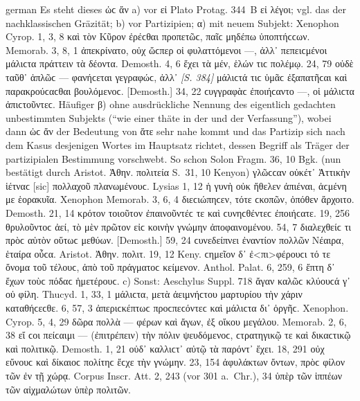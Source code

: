 \begin{otherlanguage*}{german}
Es steht dieses ὡϲ ἄν a) vor εἰ Plato Protag. 344~B  εἰ λέγοι; vgl. das  der nachklassischen Gräzität; b) vor Partizipien; α) mit neuem Subjekt: Xenophon Cyrop. 1, 3, 8 καὶ τὸν Κῦρον ἐρέϲθαι προπετῶϲ,  παῖϲ μηδέπω ὑποπτήϲϲων. Memorab. 3, 8, 1 ἀπεκρίνατο, οὐχ ὥϲπερ οἱ φυλαττόμενοι —, ἀλλ᾽  πεπειϲμένοι μάλιϲτα πράττειν τὰ δέοντα. Demosth. 4, 6 ἔχει τὰ μέν,  ἑλών τιϲ πολέμῳ. 24, 79 οὐδὲ ταῦθ᾽ ἁπλῶϲ — φανήϲεται γεγραφώϲ, ἀλλ᾽  \hypertarget{p384}{\emph{[S. 384]}}\label{p384}  μάλιϲτά τιϲ ὑμᾶϲ ἐξαπατῆϲαι καὶ παρακρούϲαϲθαι βουλόμενοϲ. [Demosth.] 34, 22 ϲυγγραφὰϲ ἐποιήϲαντο —,  οἱ μάλιϲτα ἀπιϲτοῦντεϲ. Häufiger β) ohne ausdrückliche Nennung des eigentlich gedachten unbestimmten Subjekts (“wie einer thäte in der und der Verfassung”), wobei dann ὡϲ ἄν der Bedeutung von ἅτε sehr nahe kommt und das Partizip sich nach dem Kasus desjenigen Wortes im Hauptsatz richtet, dessen Begriff als Träger der partizipialen Bestimmung vorschwebt. So schon Solon Fragm. 36, 10 Bgk. (nun bestätigt durch Aristot. Ἀθην. πολιτεία S.~31, 10 Kenyon) γλῶϲϲαν οὐκέτ᾽ Ἀττικὴν ἱέτναϲ [sic]  πολλαχοῦ πλανωμένουϲ. Lysias 1, 12 ἡ γυνὴ οὐκ ἤθελεν ἀπιέναι,  ἀϲμένη με ἑορακυῖα. Xenophon Memorab. 3, 6, 4 διεϲιώπηϲεν,  τότε ϲκοπῶν, ὁπόθεν ἄρχοιτο. Demosth. 21, 14 κρότον τοιοῦτον  ἐπαινοῦντέϲ τε καὶ ϲυνηϲθέντεϲ ἐποιήϲατε. 19, 256 θρυλοῦντοϲ ἀεί, τὸ μὲν πρῶτον  εἰϲ κοινὴν γνώμην ἀποφαινομένου. 54, 7 διαλεχθείϲ τι πρὸϲ αὑτὸν οὕτωϲ  μεθύων. [Demosth.] 59, 24 ϲυνεδείπνει ἐναντίον πολλῶν Νέαιρα,  ἑταίρα οὖϲα. Aristot. Ἀθην. πολιτ. 19, 12 Keny. ϲημεῖον δ᾽ ἐ<πι>φέρουϲι τό τε ὄνομα τοῦ τέλουϲ,  ἀπὸ τοῦ πράγματοϲ κείμενον. Anthol. Palat. 6, 259, 6 ἔπτη δ᾽  ἔχων τοὺϲ πόδαϲ ἡμετέρουϲ. c) Sonst: Aeschylus Suppl. 718 ἄγαν καλῶϲ κλύουϲά γ᾽  οὐ φίλη. Thucyd. 1, 33, 1  μάλιϲτα, μετὰ ἀειμνήϲτου μαρτυρίου τὴν χάριν καταθήϲεϲθε. 6, 57, 3 ἀπεριϲκέπτωϲ προϲπεϲόντεϲ καὶ  μάλιϲτα δι᾽ ὀργῆϲ. Xenophon. Cyrop. 5, 4, 29 δῶρα πολλὰ — φέρων καὶ ἄγων,  ἐξ οἴκου μεγάλου. Memorab. 2, 6, 38 εἴ ϲοι πείϲαιμι — (ἐπιτρέπειν) τὴν πόλιν ψευδόμενοϲ,  ϲτρατηγικῷ τε καὶ δικαϲτικῷ καὶ πολιτικῷ. Demosth. 1, 21 οὐδ᾽  καλλιϲτ᾽ αὐτῷ τὰ παρόντ᾽ ἔχει. 18, 291 οὐχ  εὔνουϲ καὶ δίκαιοϲ πολίτηϲ ἔϲχε τὴν γνώμην. 23, 154 ἀφυλάκτων ὄντων,  πρὸϲ φίλον τῶν ἐν τῇ χώρᾳ. Corpus Inscr. Att. 2, 243 (vor 301 a.~Chr.), 34 ὑπὲρ τῶν ἱππέων τῶν αἰχμαλώτων  ὑπὲρ πολιτῶν.


\end{otherlanguage*}

